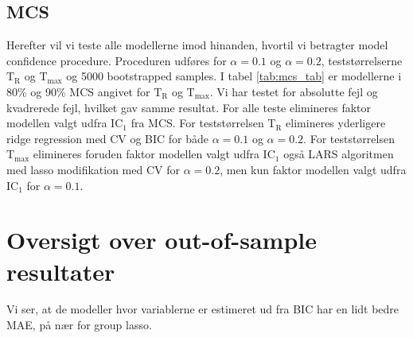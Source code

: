 \subsection{MCS} 
Herefter vil vi teste alle modellerne imod hinanden, hvortil vi betragter model confidence procedure.
Proceduren udføres for \(\alpha = 0.1\) og \(\alpha = 0.2\), teststørrelserne \(\text{T}_\text{R}\) og \(\text{T}_\text{max}\) og 5000 bootstrapped samples.
I tabel \ref{tab:mcs_tab} er modellerne i 80\% og 90\% MCS angivet for \(\text{T}_\text{R}\) og \(\text{T}_\text{max}\).
Vi har testet for absolutte fejl og kvadrerede fejl, hvilket gav samme resultat.
For alle teste elimineres faktor modellen valgt udfra IC\(_1\) fra MCS.
For teststørrelsen \(\text{T}_\text{R}\) elimineres yderligere ridge regression med CV og BIC for både \(\alpha = 0.1\) og \(\alpha = 0.2\).
For teststørrelsen \(\text{T}_\text{max}\) elimineres foruden faktor modellen valgt udfra IC\(_1\) også LARS algoritmen med lasso modifikation med CV for \(\alpha = 0.2\), men kun faktor modellen valgt udfra IC\(_1\) for \(\alpha = 0.1\).
%

%

\section{Oversigt over out-of-sample resultater}
Vi ser, at de modeller hvor variablerne er estimeret ud fra BIC har en lidt bedre MAE, på nær for group lasso. 

 

